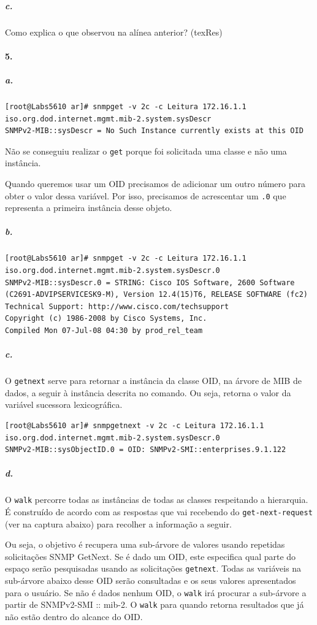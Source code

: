 \subparagraph{c.}
Como explica o que observou na alínea anterior? (texRes)


\paragraph{5.}

\subparagraph{a.}
\begin{verbatim}
[root@Labs5610 ar]# snmpget -v 2c -c Leitura 172.16.1.1 iso.org.dod.internet.mgmt.mib-2.system.sysDescr
SNMPv2-MIB::sysDescr = No Such Instance currently exists at this OID
\end{verbatim}

Não se conseguiu realizar o \texttt{get} porque foi solicitada uma classe e não uma instância.

Quando queremos usar um OID precisamos de adicionar um outro número para obter o valor dessa variável. Por isso, precisamos de acrescentar um \texttt{.0} que representa a primeira instância desse objeto.


\subparagraph{b.}
\begin{verbatim}
[root@Labs5610 ar]# snmpget -v 2c -c Leitura 172.16.1.1 iso.org.dod.internet.mgmt.mib-2.system.sysDescr.0
SNMPv2-MIB::sysDescr.0 = STRING: Cisco IOS Software, 2600 Software (C2691-ADVIPSERVICESK9-M), Version 12.4(15)T6, RELEASE SOFTWARE (fc2)
Technical Support: http://www.cisco.com/techsupport
Copyright (c) 1986-2008 by Cisco Systems, Inc.
Compiled Mon 07-Jul-08 04:30 by prod_rel_team
\end{verbatim}


\subparagraph{c.}
O \texttt{getnext} serve para retornar a instância da classe OID, na árvore de MIB de dados, a seguir à instância descrita no comando. Ou seja, retorna o valor da variável sucessora lexicográfica.


\begin{verbatim}
[root@Labs5610 ar]# snmpgetnext -v 2c -c Leitura 172.16.1.1 iso.org.dod.internet.mgmt.mib-2.system.sysDescr.0
SNMPv2-MIB::sysObjectID.0 = OID: SNMPv2-SMI::enterprises.9.1.122
\end{verbatim}


\subparagraph{d.}
O \texttt{walk} percorre todas as instâncias de todas as classes respeitando a hierarquia. É construído de  acordo com  as  respostas  que  vai  recebendo  do  \texttt{get-next-request} (ver  na captura abaixo) para recolher a informação a seguir.

Ou seja, o objetivo é recupera uma sub-árvore de valores usando repetidas solicitações SNMP GetNext. 
Se é dado um OID, este especifica qual parte do espaço serão pesquisadas usando as solicitações \texttt{getnext}. Todas as variáveis ​​na sub-árvore abaixo desse OID serão consultadas e os seus valores apresentados para o usuário.
Se não é dados nenhum OID, o \texttt{walk} irá procurar a sub-árvore a partir de SNMPv2-SMI :: mib-2.
O \texttt{walk} para quando retorna resultados que já não estão dentro do alcance do OID.

